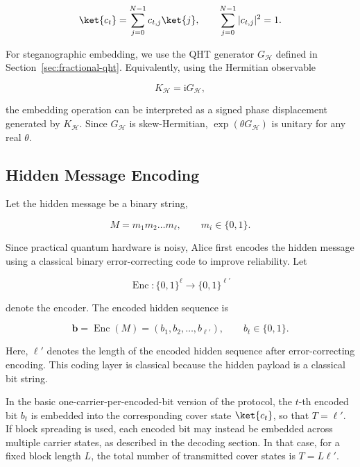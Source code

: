 \documentclass[11pt]{article}
\theoremstyle{plain}
\theoremstyle{definition}
\theoremstyle{remark}
\begin{document}
\begin{equation}
\ket{c_t}
=
\sum_{j=0}^{N-1}
c_{t,j}\ket{j},
\qquad
\sum_{j=0}^{N-1}|c_{t,j}|^2=1.
\end{equation}

For steganographic embedding, we use the QHT generator $G_{\mathcal H}$ defined in Section~\ref{sec:fractional-qht}. Equivalently, using the Hermitian observable

\begin{equation}
K_{\mathcal H}
=
\mathrm{i}G_{\mathcal H},
\end{equation}

the embedding operation can be interpreted as a signed phase displacement generated by $K_{\mathcal H}$. Since $G_{\mathcal H}$ is skew-Hermitian, $\exp(\theta G_{\mathcal H})$ is unitary for any real $\theta$.

\subsection{Hidden Message Encoding}
\label{Sec:hiddenmess}

Let the hidden message be a binary string,

\begin{equation}
M=m_1m_2\ldots m_\ell,
\qquad
m_i\in\{0,1\}.
\end{equation}

Since practical quantum hardware is noisy, Alice first encodes the hidden message using a classical binary error-correcting code to improve reliability. Let

\begin{equation}
\operatorname{Enc}:
\{0,1\}^{\ell}
\longrightarrow
\{0,1\}^{\ell'}
\end{equation}

denote the encoder. The encoded hidden sequence is

\begin{equation}
\mathbf{b}
=
\operatorname{Enc}(M)
=
(b_1,b_2,\ldots,b_{\ell'}),
\qquad
b_t\in\{0,1\}.
\end{equation}

Here, $\ell'$ denotes the length of the encoded hidden sequence after error-correcting encoding. This coding layer is classical because the hidden payload is a classical bit string.

In the basic one-carrier-per-encoded-bit version of the protocol, the $t$-th encoded bit $b_t$ is embedded into the corresponding cover state $\ket{c_t}$, so that $T=\ell'$. If block spreading is used, each encoded bit may instead be embedded across multiple carrier states, as described in the decoding section. In that case, for a fixed block length $L$, the total number of transmitted cover states is $T=L\ell'$.
\end{document}
